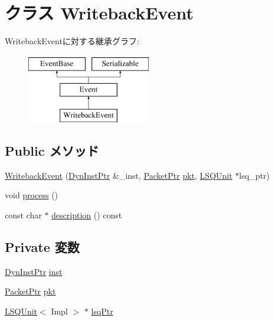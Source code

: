 \hypertarget{classLSQUnit_1_1WritebackEvent}{
\section{クラス WritebackEvent}
\label{classLSQUnit_1_1WritebackEvent}
}
WritebackEventに対する継承グラフ:\begin{figure}[H]
\begin{center}
\leavevmode
\includegraphics[height=3cm]{classLSQUnit_1_1WritebackEvent}
\end{center}
\end{figure}
\subsection*{Public メソッド}
\begin{DoxyCompactItemize}
\item 
\hyperlink{classLSQUnit_1_1WritebackEvent_ad1942b2a87a89eb815770af265c702f9}{WritebackEvent} (\hyperlink{classLSQUnit_a028ce10889c5f6450239d9e9a7347976}{DynInstPtr} \&\_\-inst, \hyperlink{classPacket}{PacketPtr} \hyperlink{classLSQUnit_1_1WritebackEvent_a3a891bc2a0fcbe6be5297077d94e2df7}{pkt}, \hyperlink{classLSQUnit}{LSQUnit} $\ast$lsq\_\-ptr)
\item 
void \hyperlink{classLSQUnit_1_1WritebackEvent_a2e9c5136d19b1a95fc427e0852deab5c}{process} ()
\item 
const char $\ast$ \hyperlink{classLSQUnit_1_1WritebackEvent_a5a14fe478e2393ff51f02e9b7be27e00}{description} () const 
\end{DoxyCompactItemize}
\subsection*{Private 変数}
\begin{DoxyCompactItemize}
\item 
\hyperlink{classLSQUnit_a028ce10889c5f6450239d9e9a7347976}{DynInstPtr} \hyperlink{classLSQUnit_1_1WritebackEvent_af5d4fb974eeb4507d4c837d365d0cefc}{inst}
\item 
\hyperlink{classPacket}{PacketPtr} \hyperlink{classLSQUnit_1_1WritebackEvent_a3a891bc2a0fcbe6be5297077d94e2df7}{pkt}
\item 
\hyperlink{classLSQUnit}{LSQUnit}$<$ Impl $>$ $\ast$ \hyperlink{classLSQUnit_1_1WritebackEvent_a5b67c681be67b18b165082d08b8bc076}{lsqPtr}
\end{DoxyCompactItemize}


